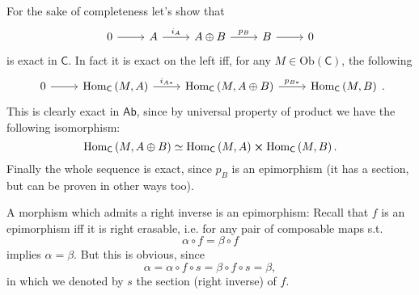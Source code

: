 \documentclass[../Main]{subfiles}
\begin{document}
\begin{rem}[]
	For the sake of completeness let's show that
	\begin{equation}
	\begin{tikzcd}
		0 \arrow[r, "", rightarrow] &
		A \arrow[r, "i_A", rightarrow] &
		A \oplus B \arrow[r, "p_B", rightarrow] &
		B \arrow[r, "", rightarrow] &
		0
	\end{tikzcd}
	\end{equation} 
	is exact in $\mathsf{C}$.
	In fact it is exact on the left iff, for any $M \in \mathrm{Ob} \left(\mathsf{C}\right)$,
	the following
	\begin{equation}
	\begin{tikzcd}
		0 \arrow[r, "", rightarrow] &
	\mathrm{Hom}_{\mathsf{C}} \left( M, A \right) \arrow[r, "i_{A*}", rightarrow] &
		\mathrm{Hom}_{\mathsf{C}} \left( M, A \oplus B \right) \arrow[r, "p_{B*}", rightarrow] &
		\mathrm{Hom}_{\mathsf{C}} \left( M, B \right)
	\end{tikzcd}
	.\end{equation} 
	This is clearly exact in $\mathsf{Ab}$, since by universal property of product we have
	the following isomorphism:
	\begin{equation}
	\mathrm{Hom}_{\mathsf{C}} \left( M, A \oplus B \right) \simeq
	\mathrm{Hom}_{\mathsf{C}} \left( M, A \right) \cross 
	\mathrm{Hom}_{\mathsf{C}} \left( M, B \right)
	.\end{equation} 
	Finally the whole sequence is exact, since $p_B$ is an
	epimorphism (it has a section, but can be proven in other ways too).
\end{rem}

\begin{rem}[]
	A morphism which admits a right inverse is an epimorphism:
	Recall that $f$ is an epimorphism iff it is right erasable,
	i.e. for any pair of composable maps s.t.
	\begin{equation}
	\alpha \circ f = \beta \circ f
	\end{equation} 
	implies $\alpha = \beta$.
	But this is obvious, since
	\begin{equation}
	\alpha = \alpha \circ f \circ s = \beta \circ f \circ s = \beta
	,\end{equation} 
	in which we denoted by $s$ the section (right inverse) of $f$.
\end{rem}
\end{document}
